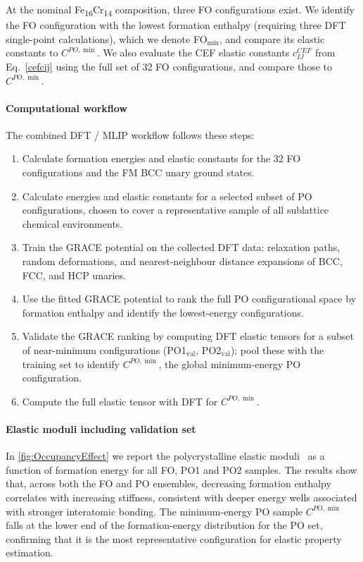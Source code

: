 \documentclass[superscriptaddress, 12pt]{revtex4-2}%
\begin{document}
At the nominal Fe\textsubscript{16}Cr\textsubscript{14} composition, three FO configurations exist.
We identify the FO configuration with the lowest formation enthalpy (requiring three DFT single-point calculations), which we denote FO$_{\min}$, and compare its elastic constants to $C^{PO,\min}$.
We also evaluate the CEF elastic constants $c_{IJ}^{CEF}$ from Eq.~\eqref{cefcij} using the full set of 32 FO configurations, and compare those to $C^{PO,\min}$.

\paragraph{Computational workflow}

The combined DFT / MLIP workflow follows these steps:
\begin{enumerate}
    \item[(1)] Calculate formation energies and elastic constants for the 32 FO configurations and the FM BCC unary ground states.
    \item[(2)] Calculate energies and elastic constants for a selected subset of PO configurations, chosen to cover a representative sample of all sublattice chemical environments.
    \item[(3)] Train the GRACE potential on the collected DFT data: relaxation paths, random deformations, and nearest-neighbour distance expansions of BCC, FCC, and HCP unaries.
    \item[(4)] Use the fitted GRACE potential to rank the full PO configurational space by formation enthalpy and identify the lowest-energy configurations.
    \item[(5)] Validate the GRACE ranking by computing DFT elastic tensors for a subset of near-minimum configurations (PO1$_\text{val}$, PO2$_\text{val}$); pool these with the training set to identify $C^{PO,\min}$, the global minimum-energy PO configuration.
    \item[(6)] Compute the full elastic tensor with DFT for $C^{PO,\min}$.
\end{enumerate}

\paragraph{Elastic moduli including validation set}

In \autoref{fig:OccupancyEffect} we report the polycrystalline elastic moduli~\cite{chung_voigtreusshill_1967} as a function of formation energy for all FO, PO1 and PO2 samples.
The results show that, across both the FO and PO ensembles, decreasing formation enthalpy correlates with increasing stiffness, consistent with deeper energy wells associated with stronger interatomic bonding.
The minimum-energy PO sample $C^{PO,\min}$ falls at the lower end of the formation-energy distribution for the PO set, confirming that it is the most representative configuration for elastic property estimation.
\end{document}
